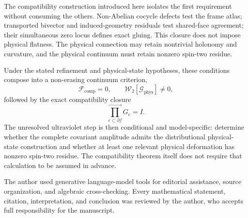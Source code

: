 \documentclass[aps,prd,reprint,nofootinbib,superscriptaddress]{revtex4-2}
\newcommand{\phys}{\mathrm{phys}}
\begin{document}
The compatibility construction introduced here isolates the first requirement without consuming the others. Non-Abelian cocycle defects test the frame atlas; transported bivector and induced-geometry residuals test shared-face agreement; their simultaneous zero locus defines exact gluing. This closure does not impose physical flatness. The physical connection may retain nontrivial holonomy and curvature, and the physical continuum must retain nonzero spin-two residue.

Under the stated refinement and physical-state hypotheses, these conditions compose into a non-erasing continuum criterion,
\begin{equation}
\mathcal F_{\mathrm{comp}}=0,
\qquad
\mathcal W_2[\mathcal G_{\phys}]\neq0,
\end{equation}
followed by the exact compatibility closure
\begin{equation}
\boxed{
\overrightarrow{\prod_{e\subset\partial f}}G_e=I.
}
\end{equation}
The unresolved ultraviolet step is then conditional and model-specific: determine whether the complete covariant amplitude admits the distributional physical-state construction and whether at least one relevant physical deformation has nonzero spin-two residue. The compatibility theorem itself does not require that calculation to be assumed in advance.

\begin{acknowledgments}
The author used generative language-model tools for editorial assistance, source organization, and algebraic cross-checking. Every mathematical statement, citation, interpretation, and conclusion was reviewed by the author, who accepts full responsibility for the manuscript.
\end{acknowledgments}
\end{document}
